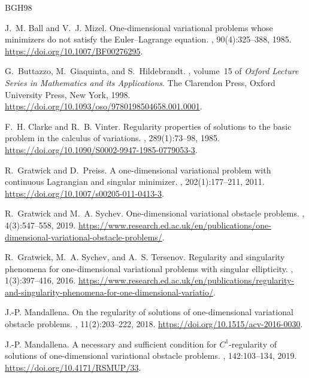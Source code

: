 \documentclass[reqno,12pt]{amsart}
\numberwithin{equation}{section}
\theoremstyle{remark}
\begin{document}
\begin{thebibliography}{BGH98}

J.~M. Ball and V.~J. Mizel.
\newblock One-dimensional variational problems whose minimizers do not satisfy the {E}uler--{L}agrange equation.
, 90(4):325--388, 1985. \url{https://doi.org/10.1007/BF00276295}.

G.~Buttazzo, M.~Giaquinta, and S.~Hildebrandt.
, volume~15 of {\em Oxford Lecture Series in Mathematics and its Applications}.
\newblock The Clarendon Press, Oxford University Press, New York, 1998. \url{https://doi.org/10.1093/oso/9780198504658.001.0001}.

F.~H. Clarke and R.~B. Vinter.
\newblock Regularity properties of solutions to the basic problem in the calculus of variations.
, 289(1):73--98, 1985. \url{https://doi.org/10.1090/S0002-9947-1985-0779053-3}.

R.~Gratwick and D.~Preiss.
\newblock A one-dimensional variational problem with continuous {L}agrangian and singular minimizer.
, 202(1):177--211, 2011. \url{https://doi.org/10.1007/s00205-011-0413-3}.

R.~Gratwick and M.~A. Sychev.
\newblock One-dimensional variational obstacle problems.
, 4(3):547--558, 2019. \url{https://www.research.ed.ac.uk/en/publications/one-dimensional-variational-obstacle-problems/}.

R.~Gratwick, M.~A. Sychev, and A.~S. Tersenov.
\newblock Regularity and singularity phenomena for one-dimensional variational problems with singular ellipticity.
, 1(3):397--416, 2016. \url{https://www.research.ed.ac.uk/en/publications/regularity-and-singularity-phenomena-for-one-dimensional-variatio/}.

J.-P. Mandallena.
\newblock On the regularity of solutions of one-dimensional variational obstacle problems.
, 11(2):203--222, 2018. \url{https://doi.org/10.1515/acv-2016-0030}.

J.-P. Mandallena.
\newblock A necessary and sufficient condition for {$C^1$}-regularity of solutions of one-dimensional variational obstacle problems.
, 142:103--134, 2019. \url{https://doi.org/10.4171/RSMUP/33}.


\end{thebibliography}
\end{document}
